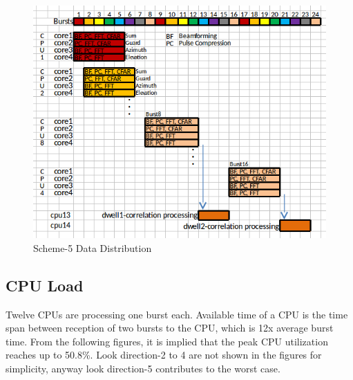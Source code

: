 \begin{figure}[h!]
	\centering
	\includegraphics[]{figures/scheme5_data_distri}
	\caption{Scheme-5 Data Distribution}
	\label{fig:mm:scheme5_data_distri}
\end{figure}


\subsection{CPU Load}
\label{ss:mm:scheme5:cpu_load}
Twelve CPUs are processing one burst each. Available time of a CPU is the time span between reception of two bursts to the CPU, which is 12x average burst time. From the following figures, it is implied that the peak CPU utilization reaches up to 50.8\%. Look direction-2 to 4 are not shown in the figures for simplicity, anyway look direction-5 contributes to the worst case.

